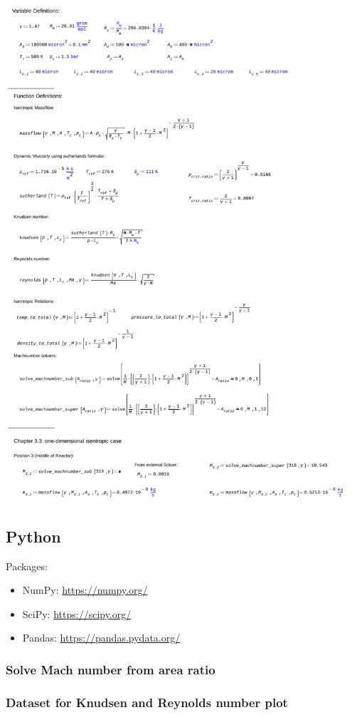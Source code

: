\includegraphics[page=3, width=0.95\textwidth]{code/calculations_thesis.pdf}
\newpage

\subsection{Python}
Packages:
\begin{itemize}
	\item NumPy: \quad \url{https://numpy.org/}
	\item SciPy: \quad \url{https://scipy.org/}
	\item Pandas: \quad \url{https://pandas.pydata.org/}
\end{itemize}
\subsubsection{Solve Mach number from area ratio}
\label{apx:mach-py}


\subsubsection{Dataset for Knudsen and Reynolds number plot}
\label{apx:knudsen-plot-py}

